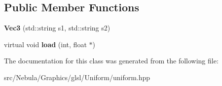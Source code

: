 \subsection*{\-Public \-Member \-Functions}
\begin{DoxyCompactItemize}
\item 
\hypertarget{classNeb_1_1glsl_1_1Uniform_1_1Vector_1_1Vec3_a1248082071bae8dbd4d346185c9b7185}{{\bfseries \-Vec3} (std\-::string s1, std\-::string s2)}\label{classNeb_1_1glsl_1_1Uniform_1_1Vector_1_1Vec3_a1248082071bae8dbd4d346185c9b7185}

\item 
\hypertarget{classNeb_1_1glsl_1_1Uniform_1_1Vector_1_1Vec3_abaee60d15c5842fd47c3e07dadb76d20}{virtual void {\bfseries load} (int, float $\ast$)}\label{classNeb_1_1glsl_1_1Uniform_1_1Vector_1_1Vec3_abaee60d15c5842fd47c3e07dadb76d20}

\end{DoxyCompactItemize}


\-The documentation for this class was generated from the following file\-:\begin{DoxyCompactItemize}
\item 
src/\-Nebula/\-Graphics/glsl/\-Uniform/uniform.\-hpp\end{DoxyCompactItemize}
